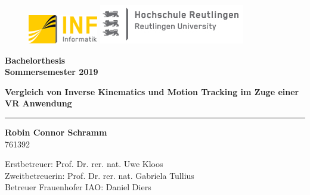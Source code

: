 \begin{titlepage}

\begin{center}

\begin{figure}
\begin{minipage}[H]{4cm}
\centering
\includegraphics[width=0.8\linewidth]{Bilder/Deckblatt/universityLogo.png}
\end{minipage}
\hfill
\begin{minipage}[H]{6cm}
\centering
\includegraphics[width=1\linewidth]{Bilder/Deckblatt/CompanyLogo.jpg}
\end{minipage}
\end{figure}

\vspace*{0.8cm}

{\large \textbf{Bachelorthesis\\}}
\vspace*{0.2cm}
{\textbf{Sommersemester 2019\\}}
\vspace*{0.4cm}
\vspace*{0.8cm}

\textbf{{\large {\Large Vergleich von Inverse Kinematics und Motion Tracking im Zuge einer VR Anwendung }}}\\

\noindent\rule{\textwidth}{2pt}
\vspace*{0.6cm}

{\large \textbf{Robin Connor Schramm\\}}
761392
\vspace*{0.6cm}

\vspace*{0.6cm}

Erstbetreuer: Prof. Dr. rer. nat. Uwe Kloos\\
Zweitbetreuerin: Prof. Dr. rer. nat. Gabriela Tullius\\
Betreuer Frauenhofer IAO: Daniel Diers
 

\end{center}

\end{titlepage}